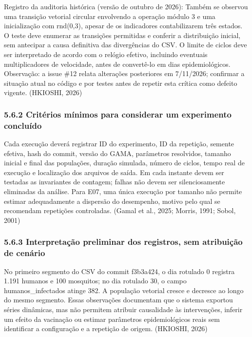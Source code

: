 Registro da auditoria histórica (versão de outubro de 2026): Também se
observou uma transição vetorial circular envolvendo a operação módulo 3
e uma inicialização com rnd(0,3), apesar de os indicadores
contabilizarem três estados. O teste deve enumerar as transições
permitidas e conferir a distribuição inicial, sem antecipar a causa
definitiva das divergências do CSV. O limite de ciclos deve ser
interpretado de acordo com o relógio efetivo, incluindo eventuais
multiplicadores de velocidade, antes de convertê-lo em dias
epidemiológicos. Observação: a issue \#12 relata alterações posteriores
em 7/11/2026; confirmar a situação atual no código e por testes antes de
repetir esta crítica como defeito vigente. (HKIOSHI, 2026)

\subsubsection{5.6.2 Critérios mínimos para considerar um experimento
concluído}\label{crituxe9rios-muxednimos-para-considerar-um-experimento-concluuxeddo}

Cada execução deverá registrar ID do experimento, ID da repetição,
semente efetiva, hash do commit, versão do GAMA, parâmetros resolvidos,
tamanho inicial e final das populações, duração simulada, número de
ciclos, tempo real de execução e localização dos arquivos de saída. Em
cada instante devem ser testadas as invariantes de contagem; falhas não
devem ser silenciosamente eliminadas da análise. Para E07, uma única
execução por tamanho não permite estimar adequadamente a dispersão do
desempenho, motivo pelo qual se recomendam repetições controladas.
(Gamal et al., 2025; Morris, 1991; Sobol, 2001)

\subsubsection{5.6.3 Interpretação preliminar dos registros, sem
atribuição de
cenário}\label{interpretauxe7uxe3o-preliminar-dos-registros-sem-atribuiuxe7uxe3o-de-cenuxe1rio}

No primeiro segmento do CSV do commit f3b3a424, o dia rotulado 0
registra 1.191 humanos e 100 mosquitos; no dia rotulado 30, o campo
humanos\_infectados atinge 382. A população vetorial cresce e decresce
ao longo do mesmo segmento. Essas observações documentam que o sistema
exportou séries dinâmicas, mas não permitem atribuir causalidade às
intervenções, inferir um efeito da vacinação ou estimar parâmetros
epidemiológicos reais sem identificar a configuração e a repetição de
origem. (HKIOSHI, 2026)


